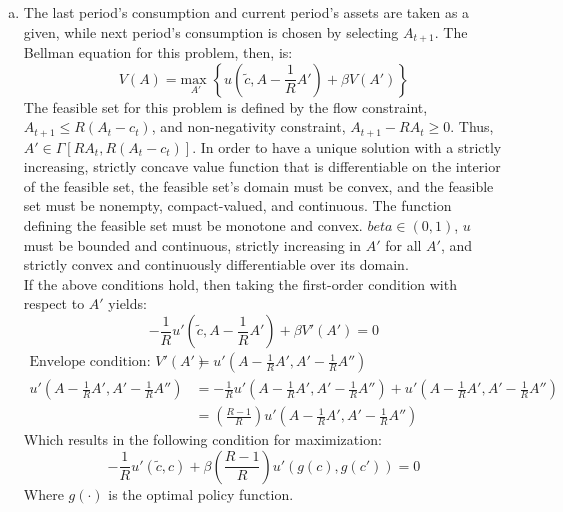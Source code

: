 \documentclass{article}
\newcommand{\usmax}[1]{\underset{#1}{\text{max }}}
\begin{document}
\begin{enumerate}[(a)]
	\item The last period's consumption and current period's assets are taken as a given, while next period's consumption is chosen by selecting $A_{t+1}$. The Bellman equation for this problem, then, is:
		\[
			V(A) = \usmax{A'}\left\{u\left(\tilde{c},A-\frac{1}{R}A'\right) + \beta V(A')\right\}
		\]
		The feasible set for this problem is defined by the flow constraint, ${A_{t+1}\leq R(A_t - c_t)}$, and non-negativity constraint, ${A_{t+1}-RA_t\geq0}$. Thus, ${A'\in\Gamma[RA_t,R(A_t - c_t)]}$. In order to have a unique solution with a strictly increasing, strictly concave value function that is differentiable on the interior of the feasible set, the feasible set's domain must be convex, and the feasible set must be nonempty, compact-valued, and continuous. The function defining the feasible set must be monotone and convex. ${beta\in(0,1)}$, $u$ must be bounded and continuous, strictly increasing in $A'$ for all $A'$, and strictly convex and continuously differentiable over its domain.
		\medskip \\
		If the above conditions hold, then taking the first-order condition with respect to $A'$ yields:
		\[
			-\frac{1}{R}u'\left(\tilde{c},A-\frac{1}{R}A'\right) + \beta V'(A') = 0
		\]
		\begin{align*}
			\text{Envelope condition: } V'(A') &= u'\left(A-\frac{1}{R}A',A'-\frac{1}{R}A''\right) 	\\
			u'\left(A-\frac{1}{R}A',A'-\frac{1}{R}A''\right)  &= -\frac{1}{R}u'\left(A-\frac{1}{R}A',A'-\frac{1}{R}A''\right)+u'\left(A-\frac{1}{R}A',A'-\frac{1}{R}A''\right)	\\
			 &= \left(\frac{R-1}{R}\right)u'\left(A-\frac{1}{R}A',A'-\frac{1}{R}A''\right)
		\end{align*}
		Which results in the following condition for maximization:
		\[
			-\frac{1}{R}u'\left(\tilde{c},c\right) + \beta  \left(\frac{R-1}{R}\right)u'\left(g(c),g(c')\right) = 0
		\]
		Where $g(\cdot)$ is the optimal policy function.
	

\end{enumerate}
\end{document}
